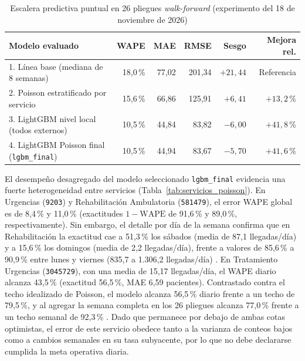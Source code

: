 \begin{table}[htbp]
\caption{Escalera predictiva puntual en 26 pliegues \textit{walk-forward} (experimento del 18 de noviembre de 2026)}
\label{tab:escalera_poisson}
{\singlespacing\small
\begin{tabularx}{\textwidth}{@{}Y r r r r r@{}}
\toprule
Modelo evaluado & WAPE & MAE & RMSE & Sesgo & Mejora rel. \\
. Línea base (mediana de 8 semanas) & 18,0\,\% & 77,02 & 201,34 & $+21{,}44$ & Referencia \\
2. Poisson estratificado por servicio & 15,6\,\% & 66,86 & 125,91 & $+6{,}41$ & $+13{,}2\,\%$ \\
3. LightGBM nivel local (todos externos) & 10,5\,\% & 44,84 & 83,82 & $-6{,}00$ & $+41{,}8\,\%$ \\
4. LightGBM Poisson final (\texttt{lgbm\_final}) & 10,5\,\% & 44,94 & 83,67 & $-5{,}70$ & $+41{,}6\,\%$ \\
\bottomrule
\end{tabularx}}
\end{table}

El desempeño desagregado del modelo seleccionado \texttt{lgbm\_final} evidencia una fuerte heterogeneidad entre servicios (Tabla~\ref{tab:servicios_poisson}). En Urgencias (\texttt{9203}) y Rehabilitación Ambulatoria (\texttt{581479}), el error WAPE global es de 8,4\,\% y 11,0\,\% (exactitudes $1-\text{WAPE}$ de 91,6\,\% y 89,0\,\%, respectivamente). Sin embargo, el detalle por día de la semana confirma que en Rehabilitación la exactitud cae a 51,3\,\% los sábados (media de 87,1 llegadas/día) y a 15,6\,\% los domingos (media de 2,2 llegadas/día), frente a valores de 85,6\,\% a 90,9\,\% entre lunes y viernes (835,7 a 1.306,2 llegadas/día) \parencite{mediflow2026demanda}. En Tratamiento Urgencias (\texttt{3045729}), con una media de 15,17 llegadas/día, el WAPE diario alcanza 43,5\,\% (exactitud 56,5\,\%, MAE 6,59 pacientes). Contrastado contra el techo idealizado de Poisson, el modelo alcanza 56,5\,\% diario frente a un techo de 79,5\,\%, y al agregar la semana completa en los 26 pliegues alcanza 77,0\,\% frente a un techo semanal de 92,3\,\% \parencite{mediflow2026demanda}. Dado que permanece por debajo de ambas cotas optimistas, el error de este servicio obedece tanto a la varianza de conteos bajos como a cambios semanales en su tasa subyacente, por lo que no debe declararse cumplida la meta operativa diaria.

